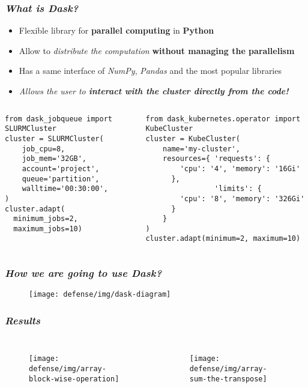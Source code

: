 
\begin{frame}[fragile]
  \frametitle{ \textit{What is Dask?}}
  \begin{itemize}
    \itemsep0em
    \item Flexible library for \alert{\textbf{parallel computing}} in
      \alert{\textbf{Python}}
    \item Allow to \textit{distribute the computation} \textbf{without managing the
      parallelism}
    \item Has a same interface of \textit{NumPy}, \textit{Pandas} and the most
      popular libraries
      \pause
    \item \textit{Allows the user to \textbf{\alert{interact with the cluster
            directly from the code!}}}
  \end{itemize}
  \pause
  \vfill
  \begin{columns}
    \scriptsize
    \begin{verbatim}
from dask_jobqueue import SLURMCluster
cluster = SLURMCluster(
    job_cpu=8,
    job_mem='32GB',
    account='project',
    queue='partition',
    walltime='00:30:00',
)
cluster.adapt(
  minimum_jobs=2,
  maximum_jobs=10)
  \end{verbatim}
    \scriptsize
    \begin{verbatim}
from dask_kubernetes.operator import KubeCluster
cluster = KubeCluster(
    name='my-cluster',
    resources={ 'requests': {
        'cpu': '4', 'memory': '16Gi'
      },
                'limits': {
        'cpu': '8', 'memory': '326Gi'
      }
    }
)
cluster.adapt(minimum=2, maximum=10)
    \end{verbatim}
  \end{columns}
\end{frame}

\begin{frame}
  \frametitle{ \textit{How we are going to use Dask?}}
  \begin{figure}
    \centering
    \texttt{[image: defense/img/dask-diagram]}
  \end{figure}
\end{frame}

\begin{frame}
  \frametitle{ \textit{Results}}
  \begin{columns}
    \begin{figure}
      \centering
      \texttt{[image: defense/img/array-block-wise-operation]}
    \end{figure}
    \begin{figure}
      \centering
      \texttt{[image: defense/img/array-sum-the-transpose]}
    \end{figure}
  \end{columns}
\end{frame}
